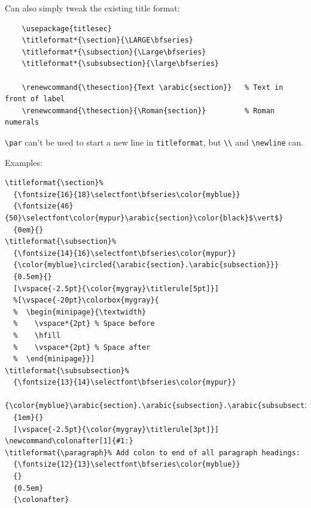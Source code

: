 \documentclass{article}
\begin{document}
Can also simply tweak the existing title format:
\begin{lstlisting}
    \usepackage{titlesec}
    \titleformat*{\section}{\LARGE\bfseries}
    \titleformat*{\subsection}{\Large\bfseries}
    \titleformat*{\subsubsection}{\large\bfseries}

    \renewcommand{\thesection}{Text \arabic{section}}   % Text in front of label
    \renewcommand{\thesection}{\Roman{section}}         % Roman numerals
\end{lstlisting}

\verb|\par| can't be used to start a new line in \verb|titleformat|, but
\verb|\\| and
\verb|\newline| can.

\clearpage
Examples:
\begin{lstlisting}
\titleformat{\section}%
  {\fontsize{16}{18}\selectfont\bfseries\color{myblue}}
  {\fontsize{46}{50}\selectfont\color{mypur}\arabic{section}\color{black}$\vert$}
  {0em}{}
\titleformat{\subsection}%
  {\fontsize{14}{16}\selectfont\bfseries\color{mypur}}
  {\color{myblue}\circled{\arabic{section}.\arabic{subsection}}}
  {0.5em}{}
  [\vspace{-2.5pt}{\color{mygray}\titlerule[5pt]}]
  %[\vspace{-20pt}\colorbox{mygray}{
  %  \begin{minipage}{\textwidth}
  %    \vspace*{2pt} % Space before
  %    \hfill
  %    \vspace*{2pt} % Space after
  %  \end{minipage}}]
\titleformat{\subsubsection}%
  {\fontsize{13}{14}\selectfont\bfseries\color{mypur}}
  {\color{myblue}\arabic{section}.\arabic{subsection}.\arabic{subsubsection}}
  {1em}{}
  [\vspace{-2.5pt}{\color{mygray}\titlerule[3pt]}]
\newcommand\colonafter[1]{#1:}
\titleformat{\paragraph}% Add colon to end of all paragraph headings:
  {\fontsize{12}{13}\selectfont\bfseries\color{myblue}}
  {}
  {0.5em}
  {\colonafter}
\end{lstlisting}
\end{document}
